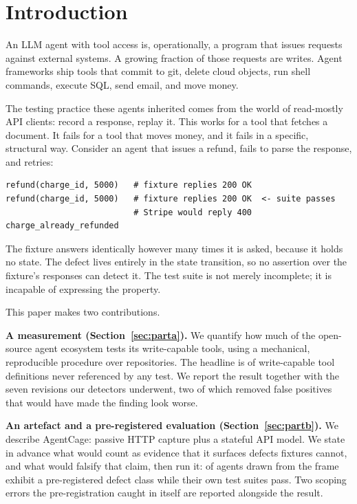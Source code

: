 \documentclass[11pt]{article}
\begin{document}
\section{Introduction}

An LLM agent with tool access is, operationally, a program that issues requests against
external systems. A growing fraction of those requests are writes. Agent frameworks ship
tools that commit to git, delete cloud objects, run shell commands, execute SQL, send
email, and move money.

The testing practice these agents inherited comes from the world of read-mostly API
clients: record a response, replay it. This works for a tool that fetches a document.
It fails for a tool that moves money, and it fails in a specific, structural way.
Consider an agent that issues a refund, fails to parse the response, and retries:

\begin{lstlisting}
refund(charge_id, 5000)   # fixture replies 200 OK
refund(charge_id, 5000)   # fixture replies 200 OK  <- suite passes
                          # Stripe would reply 400 charge_already_refunded
\end{lstlisting}

The fixture answers identically however many times it is asked, because it holds no
state. The defect lives entirely in the state transition, so no assertion over the
fixture's responses can detect it. The test suite is not merely incomplete; it is
incapable of expressing the property.

This paper makes two contributions.

\textbf{A measurement (Section~\ref{sec:parta}).} We quantify how much of the
open-source agent ecosystem tests its write-capable tools, using a mechanical,
reproducible procedure over \AcCandidates{} repositories. The headline is
\AcUncoveredPct{} of \AcTools{} write-capable tool definitions never referenced by any
test. We report the result together with the seven revisions our detectors underwent,
two of which removed false positives that would have made the finding look worse.

\textbf{An artefact and a pre-registered evaluation (Section~\ref{sec:partb}).} We
describe AgentCage: passive HTTP capture plus a stateful API model. We state in advance
what would count as evidence that it surfaces defects fixtures cannot, and what would
falsify that claim, then run it: \BbAgentsDefective{} of \BbAgentsRun{} agents drawn from
the frame exhibit a pre-registered defect class while their own test suites pass. Two
scoping errors the pre-registration caught in itself are reported alongside the result.
\end{document}
